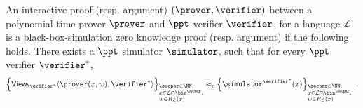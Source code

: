 \begin{definition}
	An interactive proof (resp. argument) $(\prover, \verifier)$ between a polynomial time prover $\prover$ and $\ppt$ verifier $\verifier$, for a language $\mathcal{L}$ is a black-box-simulation zero knowledge proof (resp. argument) if the following holds. There exists a $\ppt$ simulator $\simulator$, such that for every $\ppt$ verifier $\verifier^*$,
	\[
	\Big\lbrace \view_{\verifier^{*}}\langle \prover(x,w), \verifier^{*}\rangle \Big\rbrace_{\begin{subarray}{l}\secpar\in\NN,\\x\in \mathcal{L}\cap\bin^{\secpar},\\w \in R_\mathcal{L}(x)\end{subarray}} \approx_c \Big\lbrace \simulator^{\verifier^{*}}(x) \Big\rbrace_{\begin{subarray}{l}\secpar\in\NN,\\x\in \mathcal{L}\cap\bin^{\secpar},\\w \in R_\mathcal{L}(x)\end{subarray}}\enspace.
	\]		
\end{definition}